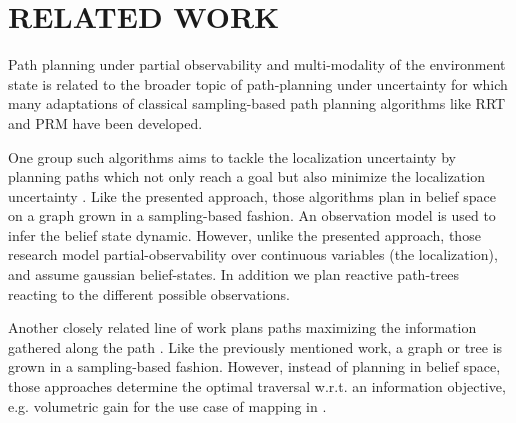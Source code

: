 \documentclass[letterpaper, 10 pt, conference]{ieeeconf}  %
\begin{document}
\section{RELATED WORK}

Path planning under partial observability and multi-modality of the environment state is related to the broader topic of path-planning under uncertainty for which many adaptations of classical sampling-based path planning algorithms like RRT \cite{lavalle1998rapidly} and PRM \cite{kavraki1996probabilistic} have been developed.

One group such algorithms aims to tackle the localization uncertainty by planning paths which not only reach a goal but also minimize the localization uncertainty \cite{prentice2010belief} \cite{bry2011rapidly}. Like the presented approach, those algorithms plan in belief space on a graph grown in a sampling-based fashion. An observation model is used to infer the belief state dynamic. However, unlike the presented approach, those research model partial-observability over continuous variables (the localization), and assume gaussian belief-states. In addition we plan reactive path-trees reacting to the different possible observations.

Another closely related line of work plans paths maximizing the information gathered along the path \cite{hollinger2014sampling} \cite{levine2010information} \cite{dang2020graph}. Like the previously mentioned work, a graph or tree is grown in a sampling-based fashion. However, instead of planning in belief space, those approaches determine the optimal traversal w.r.t. an information objective, e.g. volumetric gain for the use case of mapping in \cite{dang2020graph}.
\end{document}
